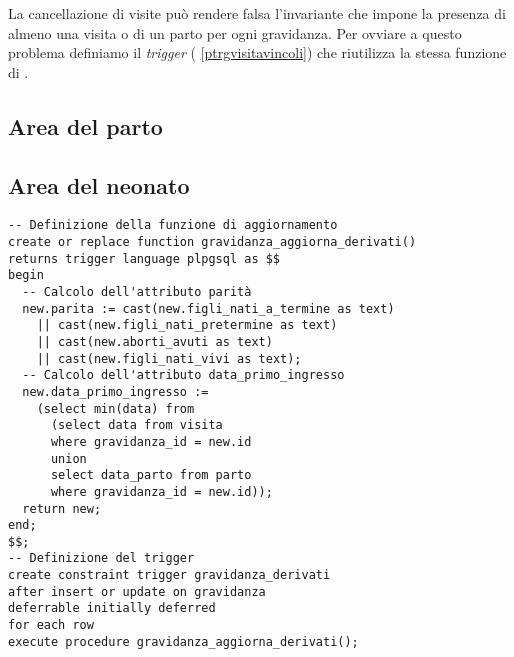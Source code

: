 La cancellazione di visite può rendere falsa l'invariante che impone la presenza di almeno una visita o di un parto per ogni gravidanza.
Per ovviare a questo problema definiamo il \emph{trigger}  (\lstlistingname{} \ref{ptrgvisitavincoli}) che riutilizza la stessa funzione di .

\subsection{Area del parto}
\label{triggersdelivery}

\subsection{Area del neonato}
\label{triggersnewborn}

\FloatBarrier %

\begin{lstlisting}[float,caption={Definizione del trigger \tab{gravidanza\_derivati}.},label=ptrggravidanzaderivati]
-- Definizione della funzione di aggiornamento
create or replace function gravidanza_aggiorna_derivati()
returns trigger language plpgsql as $$
begin
  -- Calcolo dell'attributo parità
  new.parita := cast(new.figli_nati_a_termine as text)
    || cast(new.figli_nati_pretermine as text)
    || cast(new.aborti_avuti as text)
    || cast(new.figli_nati_vivi as text);
  -- Calcolo dell'attributo data_primo_ingresso
  new.data_primo_ingresso :=
    (select min(data) from
      (select data from visita
      where gravidanza_id = new.id
      union
      select data_parto from parto
      where gravidanza_id = new.id));
  return new;
end;
$$;
-- Definizione del trigger
create constraint trigger gravidanza_derivati
after insert or update on gravidanza
deferrable initially deferred
for each row
execute procedure gravidanza_aggiorna_derivati();
\end{lstlisting}

